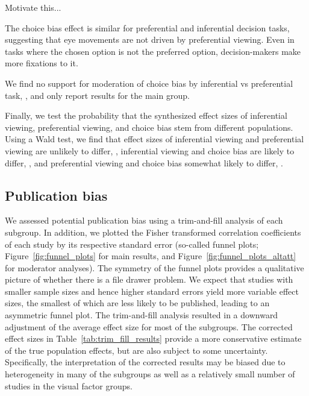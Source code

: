 \documentclass{article}
\begin{document}
Motivate this...

The choice bias effect is similar for preferential and inferential decision tasks, suggesting that eye movements are not driven by preferential viewing. Even in tasks where the chosen option is not the preferred option, decision-makers make more fixations to it.

We find no support for moderation of choice bias by inferential vs preferential task, , and only report results for the main group. 

Finally, we test the probability that the synthesized effect sizes of inferential viewing, preferential viewing, and choice bias stem from different populations. Using a Wald test, we find that effect sizes of inferential viewing and preferential viewing are unlikely to differ, , inferential viewing and choice bias are likely to differ, , and preferential viewing and choice bias somewhat likely to differ, .


\subsection{Publication bias}

We assessed potential publication bias using a trim-and-fill analysis \citep{duval2000trim} of each subgroup. In addition, we plotted the  Fisher transformed correlation coefficients of each study by its respective standard error (so-called funnel plots; Figure~\ref{fig:funnel_plots} for main results, and Figure~\ref{fig:funnel_plots_altatt} for moderator analyses). The symmetry of the funnel plots provides a qualitative picture of whether there is a file drawer problem. We expect that studies with smaller sample sizes and hence higher standard errors yield more variable effect sizes, the smallest of which are less likely to be published, leading to an asymmetric funnel plot. The trim-and-fill analysis resulted in a downward adjustment of the average effect size for most of the subgroups. The corrected effect sizes in Table~\ref{tab:trim_fill_results} provide a more conservative estimate of the true population effects, but are also subject to some uncertainty. Specifically, the interpretation of the corrected results may be biased due to heterogeneity in many of the subgroups as well as a relatively small number of studies in the visual factor groups. 
\end{document}
